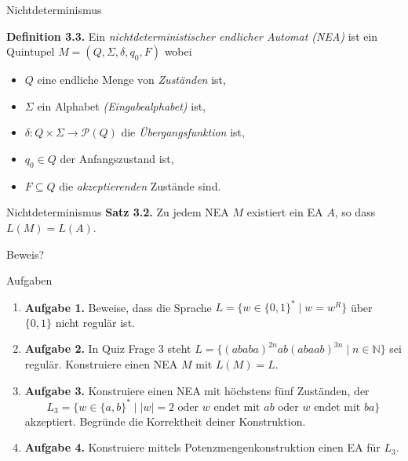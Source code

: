 \documentclass[11pt,aspectratio=169]{beamer}
\begin{document}
\begin{frame}{Nichtdeterminismus}

\textbf{Definition 3.3.}
Ein \textit{nichtdeterministischer endlicher Automat (NEA)} ist ein
Quintupel \(M = (Q, \Sigma, \delta, q_0, F)\) wobei
\begin{itemize}
    \item \(Q\) eine endliche Menge von \textit{Zuständen} ist,
    \item \(\Sigma\) ein Alphabet \textit{(Eingabealphabet)} ist,
    \item \(\delta \colon Q \times \Sigma \to \mathcal P(Q)\) die \textit{Übergangsfunktion} ist,
    \item \(q_0 \in Q\) der Anfangszustand ist,
    \item \(F \subseteq Q\) die \textit{akzeptierenden} Zustände sind.
\end{itemize}

\end{frame}

\begin{frame}{Nichtdeterminismus}
\textbf{Satz 3.2.} Zu jedem NEA \(M\) existiert ein EA \(A\), so dass \(L(M) = L(A)\).

\vspace{2em}

Beweis?

\end{frame}


\begin{frame}{Aufgaben}
    \begin{enumerate}
        \justifying
        \item \textbf{Aufgabe 1.}
            Beweise, dass die Sprache \(L = \{w \in \{0, 1\}^* \mid w = w^R\}\) über \(\{0, 1\}\) nicht regulär ist.
        \item \textbf{Aufgabe 2.}
            In Quiz Frage 3 steht \(L = \{(ababa)^{2n} ab (abaab)^{3n} \mid n \in \mathbb N\}\) sei regulär.
            Konstruiere einen NEA \(M\) mit \(L(M) = L\).
        \item \textbf{Aufgabe 3.}
            Konstruiere einen NEA mit höchstens fünf Zuständen, der
            \[
                L_3 = \{ w \in \{a, b\}^* \mid |w| = 2 \text{ oder } w \text{ endet mit } ab \text{ oder } w \text{ endet mit } ba\}
            \]
            akzeptiert. Begründe die Korrektheit deiner Konstruktion.
        \item \textbf{Aufgabe 4.}
            Konstruiere mittels Potenzmengenkonstruktion einen EA für \(L_3\).
    \end{enumerate}
\end{frame}
\end{document}

